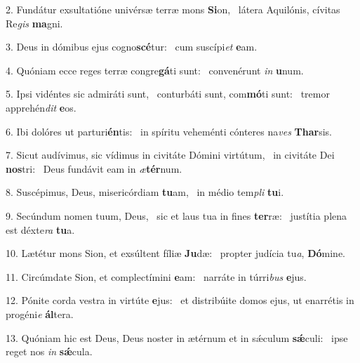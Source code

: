 2. Fundátur exsultatióne univérsæ terræ mons \textbf{Si}on, \ast\  látera Aquilónis, cívitas Re\textit{gis} \textbf{ma}gni.\

3. Deus in dómibus ejus cogno\textbf{scé}tur: \ast\  cum suscípi\textit{et} \textbf{e}am.\

4. Quóniam ecce reges terræ congre\textbf{gá}ti sunt: \ast\  convenérunt \textit{in} \textbf{u}num.\

5. Ipsi vidéntes sic admiráti sunt, \dag\  conturbáti sunt, com\textbf{mó}ti sunt: \ast\  tremor apprehén\textit{dit} \textbf{e}os.\

6. Ibi dolóres ut parturi\textbf{én}tis: \ast\  in spíritu veheménti cónteres na\textit{ves} \textbf{Thar}sis.\

7. Sicut audívimus, sic vídimus in civitáte Dómini virtútum, \dag\  in civitáte Dei \textbf{nos}tri: \ast\  Deus fundávit eam in \textit{æ}\textbf{tér}num.\

8. Suscépimus, Deus, misericórdiam \textbf{tu}am, \ast\  in médio tem\textit{pli} \textbf{tu}i.\

9. Secúndum nomen tuum, Deus, \dag\  sic et laus tua in fines \textbf{ter}ræ: \ast\  justítia plena est déxte\textit{ra} \textbf{tu}a.\

10. Lætétur mons Sion, et exsúltent fíliæ \textbf{Ju}dæ: \ast\  propter judícia tu\textit{a}, \textbf{Dó}mine.\

11. Circúmdate Sion, et complectímini \textbf{e}am: \ast\  narráte in túrri\textit{bus} \textbf{e}jus.\

12. Pónite corda vestra in virtúte \textbf{e}jus: \ast\  et distribúite domos ejus, ut enarrétis in progéni\textit{e} \textbf{ál}tera.\

13. Quóniam hic est Deus, Deus noster in ætérnum et in sǽculum \textbf{sǽ}culi: \ast\  ipse reget nos \textit{in} \textbf{sǽ}cula.\

